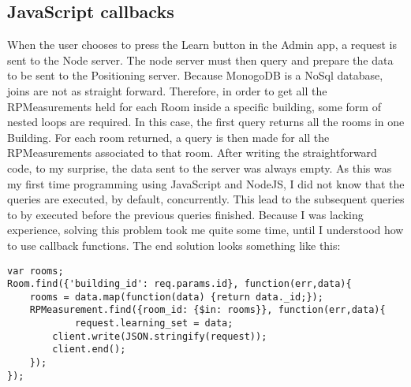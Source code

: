 \subsection{JavaScript callbacks} 
When the user chooses to press the Learn button in the Admin app, a request is sent to the Node server. The node server must then query and prepare the data to be sent to the Positioning server. Because MonogoDB is a NoSql database, joins are not as straight forward. Therefore, in order to get all the RPMeasurements held for each Room inside a specific building, some form of nested loops are required. In this case, the first query returns all the rooms in one Building. For each room returned, a query is then made for all the RPMeasurements associated to that room. After writing the straightforward code, to my surprise, the data sent to the server was always empty. As this was my first time programming using JavaScript and NodeJS, I did not know that the queries are executed, by default, concurrently. This lead to the subsequent queries to by executed before the previous queries finished. Because I was lacking experience, solving this problem took me quite some time, until I understood how to use callback functions. The end solution looks something like this:
\begin{lstlisting}
var rooms;
Room.find({'building_id': req.params.id}, function(err,data){
	rooms = data.map(function(data) {return data._id;});
    RPMeasurement.find({room_id: {$in: rooms}}, function(err,data){
    		request.learning_set = data;
        client.write(JSON.stringify(request));
        client.end();
    });
});
\end{lstlisting}